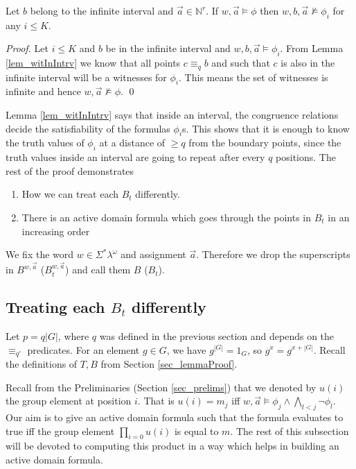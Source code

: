 \documentclass[envcountsame]{llncs}
\newcommand{\Nat}{\mathbb{N}}
\begin{document}
\begin{lemma}
 \label{lem_infInterval}
 Let $b$ belong to the infinite interval and $\vec a \in \Nat^r$. If $w, \vec a \vDash \phi$ then 
$w,b, \vec a \nvDash \phi_i$ for any $i\leq K$.
\end{lemma}
\begin{proof}
Let $i \leq K$ and $b$ be in the infinite interval and $w,b, \vec a \vDash \phi_i$. From Lemma \ref{lem_witInIntrv} we know that all points
$c \equiv_q b$ and such that $c$ is also in the infinite interval will be a witnesses for $\phi_i$. This means the set of witnesses is infinite and hence $w,\vec a \nvDash \phi$.
\qed \end{proof}

Lemma \ref{lem_witInIntrv} says that inside an interval, the congruence relations decide the satisfiability of the formulas $\phi_i$s.
This shows that it is enough to know the truth values of $\phi_i$ at a distance of $\geq q$ from the boundary points, since the truth
values inside an interval are going to repeat after every $q$ positions.
The rest of the proof demonstrates 
\begin{enumerate}
 \item How we can treat each $B_t$ differently. 
\item There is an active domain formula which goes through the points in $B_t$ in an increasing order
\end{enumerate}
We fix the word $w \in \Sigma^*\lambda^{\omega}$ and assignment $\vec a$. Therefore we drop the superscripts in
$B^{w,\vec a}$ ($B_t^{w,\vec a}$) and call them $B$ ($B_t$). 
\subsection{Treating each $B_t$ differently}
Let $p=q|G|$, where $q$ was defined in the previous section and depends on the $\equiv_{q'}$ predicates.
For an element $g\in G$, we have $g^{|G|}=1_G$, so $g^x=g^{x+|G|}$.
Recall the definitions of $T, B$ from Section \ref{sec_lemmaProof}. 

Recall from the Preliminaries (Section \ref{sec_prelims}) that we denoted by $u(i)$ the group element at position $i$. That is
$u(i)=m_j$ iff $w,\vec a \models \phi_j \wedge \bigwedge_{l<j} \neg \phi_l$. Our aim is to give an active domain formula such that the formula evaluates to true iff the group element $\prod_{i=0} u(i)$ is equal to $m$. The rest of this subsection will be devoted to computing this product in a way which helps in building an active domain formula.
\end{document}
